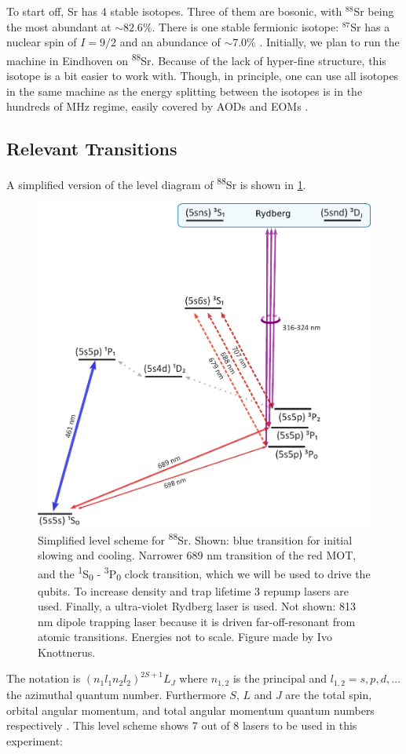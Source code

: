To start off, Sr has 4 stable isotopes.
Three of them are bosonic, with ${}^{88}$Sr being the most abundant at $\sim82.6\%$. There is one stable fermionic isotope: ${}^{87}$Sr has a nuclear spin of $I=9/2$ and an abundance of $\sim7.0\%$ \cite{Coursey1999}.
Initially, we plan to run the machine in Eindhoven on \textsuperscript{88}Sr. 
Because of the lack of hyper-fine structure, this isotope is a bit easier to work with.
Though, in principle, one can use all isotopes in the same machine as the energy splitting between the isotopes is in the hundreds of MHz regime, easily covered by AODs and EOMs \cite{Stellmer2013}.

\subsection{Relevant Transitions}\label{subsec:Transitions}

A simplified version of the level diagram of \textsuperscript{88}Sr is shown in \cref{fig:SrLevel}. 
\begin{figure}
	\centering
	\includegraphics[width=0.76\linewidth]{figures/SrLevelRydberg.pdf}
	\caption{Simplified level scheme for \textsuperscript{88}Sr. 
	Shown: blue transition for initial slowing and cooling.
	Narrower 689 nm transition of the red \ac{MOT}, and the \textsuperscript{1}S\textsubscript{0} - \textsuperscript{3}P\textsubscript{0} clock transition, which we will be used to drive the qubits. 
	To increase density and trap lifetime 3 repump lasers are used. 
	Finally, a ultra-violet Rydberg laser is used.
	Not shown: 813 nm dipole trapping laser because it is driven far-off-resonant from atomic transitions. Energies not to scale. Figure made by Ivo Knottnerus.}
	\label{fig:SrLevel}
\end{figure}
The notation is $(n_1l_1 n_2l_2)^{2S+1}L_J$ where $n_{1,2}$ is the principal and $l_{1,2} = s, p, d, \ldots$ the azimuthal quantum number. 
Furthermore $S$, $L$ and $J$ are the total spin, orbital angular momentum, and total angular momentum quantum numbers respectively \cite{Cowan1981}. 
This level scheme shows 7 out of 8 lasers to be used in this experiment:

